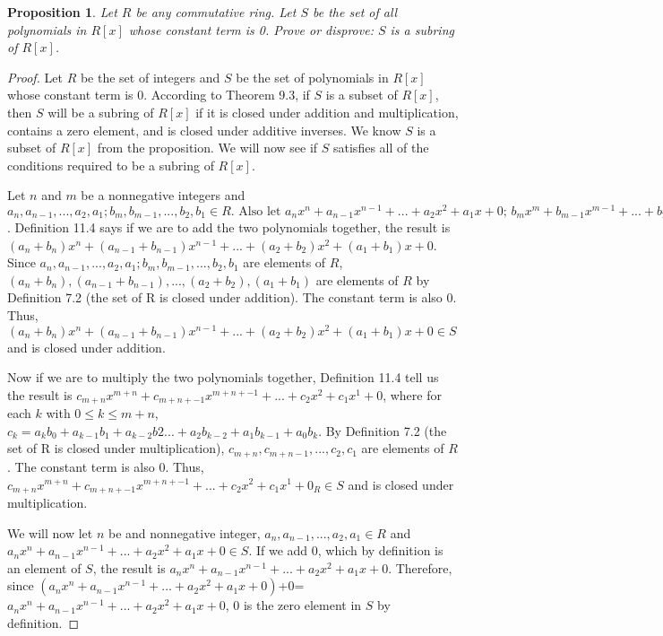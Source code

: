 \documentclass[11 pt]{article}
\newtheorem{proposition}{Proposition}
\newcommand{\newpar}{\vspace{.15in}\noindent}
\begin{document}
\newpar
\begin{proposition}
Let $R$ be any commutative ring. Let $S$ be the set of all polynomials in $R[x]$ whose constant term is 0. Prove or disprove: $S$ is a subring of $R[x]$.
\end{proposition}
\begin{proof}
\newpar 
Let $R$ be the set of integers and $S$ be the set of polynomials in $R[x]$ whose constant term is 0. According to Theorem 9.3, if $S$ is a subset of $R[x]$, then $S$ will be a subring of $R[x]$ if it is closed under addition and multiplication, contains a zero element, and is closed under additive inverses. We know $S$ is a subset of $R[x]$ from the proposition. We will now see if $S$ satisfies all of the conditions required to be a subring of $R[x]$.

\newpar
  Let $n$ and $m$ be a nonnegative integers and $a_n, a_{n-1},. . .,a_2, a_1; b_m, b_{m-1},. . .,b_2, b_1\in R \text{. Also let } a_nx^n+a_{n-1}x^{n-1}+. . .+a_2x^2+a_1x+0\text{; } b_mx^m+b_{m-1}x^{m-1}+. . .+b_2x^2+b_1x+0 \in S \text{ with } a_n \neq0, b_n\neq0$. Definition 11.4 says if we are to add the two polynomials together, the result is $(a_n+b_n)x^n+(a_{n-1}+b_{n-1})x^{n-1}+. . .+(a_2+b_2)x^2+(a_1+b_1)x+0$. Since $a_n, a_{n-1},. . .,a_2, a_1; b_m, b_{m-1},. . .,b_2, b_1$ are elements of $R$, $(a_n+b_n), (a_{n-1}+b_{n-1}),. . .,(a_2+b_2), (a_1+b_1)$ are elements of $R$ by Definition 7.2 (the set of R is closed under addition). The constant term is also 0. Thus, $(a_n+b_n)x^n+(a_{n-1}+b_{n-1})x^{n-1}+. . .+(a_2+b_2)x^2+(a_1+b_1)x+0 \in S$ and is closed under addition.
  
\newpar
Now if we are to multiply the two polynomials together, Definition 11.4 tell us the result is $c_{m+n}x^{m+n}+c_{m+n+-1}x^{m+n+-1}+. . .+ c_2x^2+c_1x^1+0$, where for each $k$ with $0\le k\le m+n$, $c_k=a_kb_0+a_{k-1}b_1+a_{k-2}b2. . .+a_2b_{k-2}+a_1b_{k-1}+a_0b_k$. By Definition 7.2 (the set of R is closed under multiplication), $c_{m+n},c_{m+n-1},. . ., c_2, c_1$ are elements of $R$. The constant term is also 0. Thus, $c_{m+n}x^{m+n}+c_{m+n+-1}x^{m+n+-1}+. . .+ c_2x^2+c_1x^1+0_R \in S$ and is closed under multiplication.
  
  \newpar
  We will now let $n$ be and nonnegative integer, $a_n, a_{n-1},. . .,a_2, a_1 \in R$ and $a_nx^n+a_{n-1}x^{n-1}+. . .+a_2x^2+a_1x+0 \in S$. If we add $0$, which by definition is an element of $S$, the result is $a_nx^n+a_{n-1}x^{n-1}+. . .+a_2x^2+a_1x+0$. Therefore, since $(a_nx^n+a_{n-1}x^{n-1}+. . .+a_2x^2+a_1x+0)$+$0$=$a_nx^n+a_{n-1}x^{n-1}+. . .+a_2x^2+a_1x+0$, $0$ is the zero element in $S$ by definition.
  

\end{proof}
\end{document}
